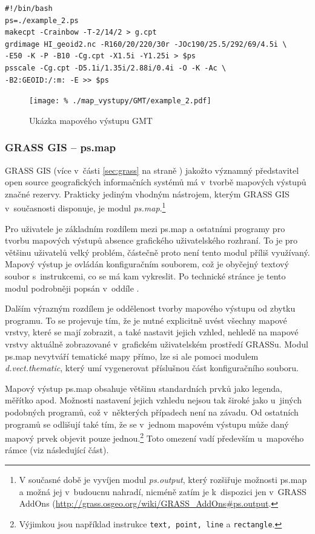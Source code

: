 \documentclass[a4paper,12pt,draft]{article}
\newcommand{\modul}[1]{\emph{#1}}
\newcommand{\instr}[1]{\lstinline[style=psmapInline]|#1|}
\begin{document}
\begin{lstlisting}[style=script]
#!/bin/bash
ps=./example_2.ps
makecpt -Crainbow -T-2/14/2 > g.cpt
grdimage HI_geoid2.nc -R160/20/220/30r -JOc190/25.5/292/69/4.5i \
-E50 -K -P -B10 -Cg.cpt -X1.5i -Y1.25i > $ps
psscale -Cg.cpt -D5.1i/1.35i/2.88i/0.4i -O -K -Ac \
-B2:GEOID:/:m: -E >> $ps
\end{lstlisting}


\begin{figure}[h!]
\centering
\texttt{[image: \%
./map\_vystupy/GMT/example\_2.pdf]}
  \caption{Ukázka mapového výstupu GMT}
  \label{fig:gmt}
\end{figure}



\subsubsection{GRASS GIS -- ps.map}
\label{sec:porovnani:psmap}
GRASS GIS (více v~části \ref{sec:grass} na straně \pageref{sec:grass})
jakožto významný představitel open source geografických informačních
systémů má v~tvorbě mapových výstupů značné rezervy. Prakticky
jediným vhodným nástrojem, kterým GRASS GIS v~současnosti disponuje,
je modul \modul{ps.map}.\footnote{V současné době je vyvíjen modul
\modul{ps.output}, který rozšiřuje možnosti ps.map a možná
jej v~budoucnu nahradí, nicméně zatím je k~dispozici jen v~GRASS AddOns
(\url{http://grass.osgeo.org/wiki/GRASS_AddOns\#ps.output}.}

Pro uživatele je základním rozdílem mezi ps.map a ostatními
programy pro tvorbu mapových výstupů  absence grafického uživatelského
rozhraní. To je pro většinu uživatelů velký problém, částečně
proto není tento modul příliš využívaný. Mapový výstup je ovládán
konfiguračním souborem, což je obyčejný textový soubor s~instrukcemi,
co se má kam vykreslit. Po technické stránce je tento modul podrobněji
popsán v~oddíle \nameref{sec:psmap}.

Dalším výrazným rozdílem je oddělenost tvorby mapového výstupu od
zbytku programu. To se projevuje tím, že je nutné explicitně uvést
všechny mapové vrstvy, které se mají zobrazit, a také nastavit jejich
vzhled, nehledě na mapové vrstvy aktuálně zobrazované  v~grafickém
uživatelském prostředí GRASSu. Modul ps.map nevytváří
tematické mapy přímo, lze si ale pomoci modulem \emph{d.vect.thematic},
který umí vygenerovat příslušnou část konfiguračního souboru.



Mapový výstup ps.map obsahuje většinu standardních prvků jako
legenda, mě\-řítko apod. Možnosti nastavení jejich vzhledu nejsou tak
široké jako u~jiných podobných programů, což v~některých případech není na
závadu.
Od ostatních programů se odlišují také tím, že se v~jednom mapovém výstupu může
daný mapový prvek objevit pouze jednou.\footnote{Výjimkou jsou například
instrukce \instr{text, point, line} a \instr{rectangle}.} Toto omezení 
vadí především u~mapového rámce (viz následující část).
\end{document}
